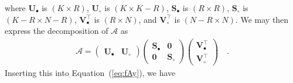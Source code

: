 \documentclass[modern]{aastex62}
\begin{document}
%
where
$\mathbf{U}_\bullet$ is $(K \times R)$,
$\mathbf{U}_\circ$ is $(K \times K - R)$,
$\mathbf{S}_\bullet$ is $(R \times R)$,
$\mathbf{S}_\circ$ is $(K - R \times N - R)$,
$\mathbf{V}_\bullet^\top$ is $(R \times N)$,
and
$\mathbf{V}_\circ^\top$ is $(N - R \times N)$.
%
We may then express the decomposition of $\pmb{\mathcal{A}}$ as
%
\begin{align}
    \label{eq:A}
    \pmb{\mathcal{A}} =
    \left(
    \begin{array}{c|c}
            \mathbf{U}_\bullet & \mathbf{U}_\circ
        \end{array}
    \right)
    \left(
    \begin{array}{c|c}
            \mathbf{S}_\bullet & \mathbf{0}       \\
            \hline
            \mathbf{0}         & \mathbf{S}_\circ
        \end{array}
    \right)
    \left(
    \begin{array}{cc}
            \mathbf{V}_\bullet^\top \\
            \hline
            \mathbf{V}_\circ^\top
        \end{array}
    \right)
    \quad.
\end{align}
%
Inserting this into Equation~(\ref{eq:fAy}), we have
%
\end{document}
